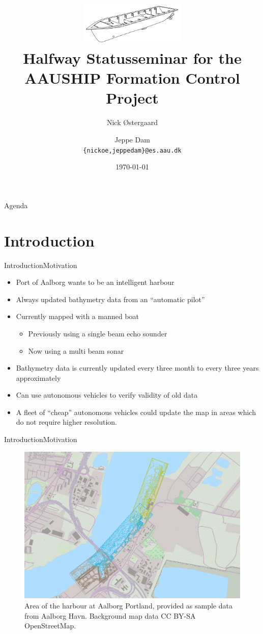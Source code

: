 \documentclass[10pt,handout]{beamer}
\title[AAUSHIP\\ Formation Control]%
{\includegraphics[width=5cm]{../thesis/frontmatter/aauship}\\ Halfway Statusseminar for the\\ AAUSHIP Formation Control Project}
\author[14gr1034]{%
  Nick Østergaard \and Jeppe Dam\\
  {{\tt \{nickoe,jeppedam\}@es.aau.dk}}
}
\institute[
  Dept.\ of Electronic Systems,\\
  Aalborg University,\\
  Denmark
] %
{%
  Department of Electronic Systems,\\
  Aalborg University,\\
  Denmark
  
}
\date{\today}
\begin{document}
\begin{frame}[plain] %
  \titlepage
\end{frame}

\begin{frame}{Agenda}{}
\tableofcontents
\end{frame}
\section{Introduction}
\begin{frame}{Introduction}{Motivation}
  \begin{itemize}
    \item Port of Aalborg wants to be an intelligent harbour
    \item Always updated bathymetry data from an ``automatic pilot''
    \item Currently mapped with a manned boat
    \begin{itemize}
      \item Previously using a single beam echo sounder
      \item Now using a multi beam sonar
    \end{itemize}
    \item Bathymetry data is currently updated every three month to every three years approximately
    \item Can use autonomous vehicles to verify validity of old data
    \item A fleet of ``cheap'' autonomous vehicles could update the map in areas which do not require higher resolution.
  \end{itemize}
\end{frame}

\begin{frame}{Introduction}{Motivation}
  \begin{figure}
	  \includegraphics[width=\textwidth]{../thesis/fig/use-case-data}
	  \caption{\scriptsize Area of the harbour at Aalborg Portland, provided as sample
	  data from Aalborg Havn. Background map data CC BY-SA OpenStreetMap.}
  \end{figure}
\end{frame}
\end{document}

